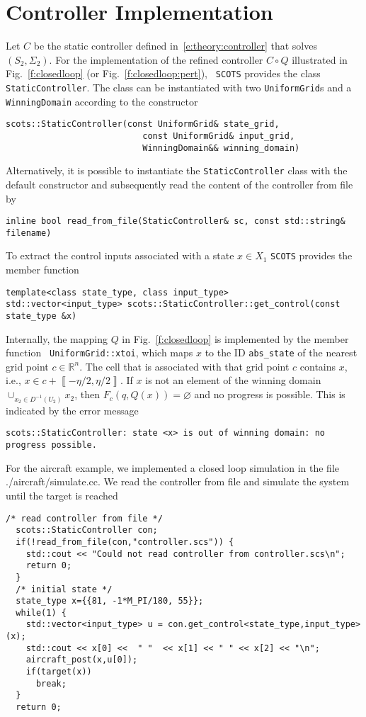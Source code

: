 \documentclass[a4paper]{amsart}
\newcommand{\segcc}[1]{\ensuremath{{\left\llbracket#1\right\rrbracket}}}
\newcommand{\R}{\mathbb{R}}
\renewcommand{\emptyset}{{\varnothing}}
\begin{document}
\section{Controller Implementation}
\label{s:usage:simulation}
Let $C$ be the static controller defined in~\eqref{e:theory:controller} that
solves $(S_2,\Sigma_2)$. For the implementation of the refined controller $C\circ Q$
illustrated in Fig.~\ref{f:closedloop} (or Fig.~\ref{f:closedloop:pert}),  {\tt
SCOTS} provides the class {\tt StaticController}. The class can be instantiated with two {\tt UniformGrid}s and a {\tt
WinningDomain} according to the constructor
\begin{lstlisting}[basicstyle=\small\ttfamily]
scots::StaticController(const UniformGrid& state_grid,
                           const UniformGrid& input_grid,
                           WinningDomain&& winning_domain)
\end{lstlisting}
Alternatively, it is possible to instantiate the {\tt StaticController} class with the
default constructor and subsequently read the content of the controller from file by
\begin{lstlisting}[basicstyle=\small\ttfamily]
inline bool read_from_file(StaticController& sc, const std::string& filename) 
\end{lstlisting}
To extract the control inputs associated with a state $x\in X_1$ {\tt SCOTS}
provides the member function
\begin{lstlisting}[basicstyle=\small\ttfamily]
template<class state_type, class input_type>
std::vector<input_type> scots::StaticController::get_control(const state_type &x)
\end{lstlisting}
Internally, the mapping $Q$ in Fig.~\ref{f:closedloop}
is implemented by the member function {\tt
UniformGrid::xtoi}, which maps $x$ to the ID {\tt abs\_state} of the nearest
grid point $c\in \R^n$. The cell that is
associated with that grid point $c$ contains $x$, i.e., $x\in
c+\segcc{-\eta/2,\eta/2}$. If $x$ is not an element of the winning domain $\cup_{x_2\in
D^{-1}(U_2)}x_2$, then $F_c(q,Q(x))=\emptyset$ and no progress is possible. This
is indicated by the error message
\begin{lstlisting}[basicstyle=\small\ttfamily]
scots::StaticController: state <x> is out of winning domain: no progress possible.
\end{lstlisting}

For the aircraft example, we implemented a closed loop simulation in the file
{./aircraft/simulate.cc}. We read the controller from file and simulate the
system until the target is reached
\begin{lstlisting}[basicstyle=\small\ttfamily]
  /* read controller from file */
  scots::StaticController con;
  if(!read_from_file(con,"controller.scs")) {
    std::cout << "Could not read controller from controller.scs\n";
    return 0;
  }
  /* initial state */
  state_type x={{81, -1*M_PI/180, 55}};
  while(1) {
    std::vector<input_type> u = con.get_control<state_type,input_type>(x);
    std::cout << x[0] <<  " "  << x[1] << " " << x[2] << "\n";
    aircraft_post(x,u[0]);
    if(target(x)) 
      break;
  }
  return 0;
\end{lstlisting}
\end{document}
